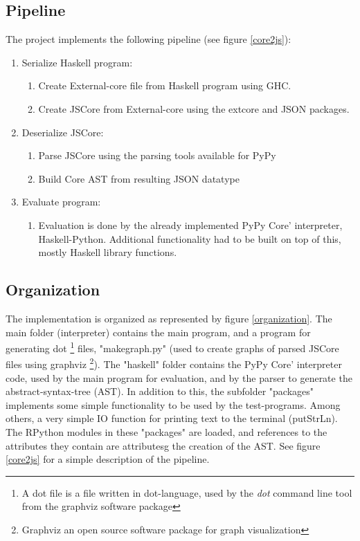 \subsection{Pipeline}

The project implements the following pipeline (see figure \ref{core2js}):
\begin{enumerate}
\item Serialize Haskell program: 
  \begin{enumerate}
  \item Create External-core file from Haskell program using GHC.
  \item Create JSCore from External-core using the extcore and JSON packages.
  \end{enumerate}
\item Deserialize JSCore:
  \begin{enumerate}
  \item Parse JSCore using the parsing tools available for PyPy
  \item Build Core AST from resulting JSON datatype
  \end{enumerate}
\item Evaluate program:
  \begin{enumerate}
  \item Evaluation is done by the already implemented PyPy Core' interpreter,
  Haskell-Python. Additional functionality had to be built on top of this, mostly 
  Haskell library functions.
  \end {enumerate}
\end{enumerate}

\subsection{Organization}

The implementation is organized as represented by figure \ref{organization}. The
main folder (interpreter) contains the main program, and a program for generating
dot
\footnote{ A dot file is a file written in dot-language, used by the \emph{dot} command
line tool from the graphviz software package}
files, "makegraph.py" (used to create graphs of parsed JSCore files using graphviz
\footnote{ Graphviz an open source software package for graph visualization}). 
The "haskell" folder
contains the PyPy Core' interpreter code, used by the main program for evaluation, 
and by the parser to generate the abstract-syntax-tree (AST). In addition to this,
the subfolder "packages" implements some simple functionality to be used by the test-programs.
Among others, a very simple IO function for printing text to the terminal (putStrLn).
The RPython modules in these "packages" are loaded, and references to the attributes
they contain are attributesg
the creation of the AST. See figure \ref{core2js} for a simple description of the pipeline.

